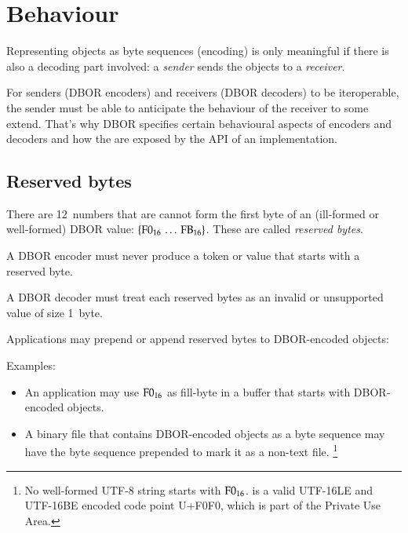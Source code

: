 
\section{Behaviour}
\label{sec:behaviour}

Representing objects as byte sequences (encoding) is only meaningful if there is also a decoding part involved:
a \emph{sender} sends the objects to a \emph{receiver}.

For senders (DBOR encoders) and receivers (DBOR decoders) to be iteroperable, the sender must be able to anticipate the
behaviour of the receiver to some extend.
That's why DBOR specifies certain behavioural aspects of encoders and decoders and how the are exposed by the API
of an implementation.


\subsection{Reserved bytes}
\label{sec:reservedbytes}

There are 12~numbers that are cannot form the first byte of an (ill-formed or well-formed) DBOR value:
$\{\mathrm{F0}_{16} \,\ldots\, \mathrm{FB}_{16}\}$. These are called \emph{reserved bytes}.

\medskip
A DBOR encoder must never produce a token or value that starts with a reserved byte.

A DBOR decoder must treat each reserved bytes as an invalid or unsupported value of size 1~byte.

\medskip
Applications may prepend or append reserved bytes to DBOR-encoded objects:
\begin{BeginParPenalty}
    Examples:
    \begin{itemize}
        \item
        An application may use $\mathrm{F0}_{16}$ as fill-byte in a buffer that starts with
        DBOR-encoded objects.

        \item
        A binary file that contains DBOR-encoded objects as a byte sequence may have the byte sequence
         prepended to mark it as a non-text file.%
        \footnote{%
           No well-formed UTF-8 string starts with $\mathrm{F0}_{16}$.
            is a valid UTF-16LE and UTF-16BE encoded code point U+F0F0,
           which is part of the Private Use Area.
        }
    \end{itemize}
\end{BeginParPenalty}


